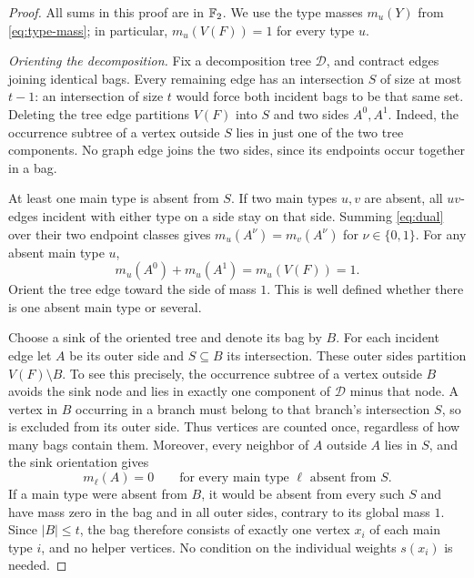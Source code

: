 \begin{proof}
All sums in this proof are in \(\mathbb F_2\).
We use the type masses \(m_u(Y)\) from \eqref{eq:type-mass};
in particular, \(m_u(V(F))=1\) for every type \(u\).

\smallskip
\noindent\emph{Orienting the decomposition.}
Fix a decomposition tree \(\mathcal D\), and contract edges joining
identical bags.  Every remaining edge has an intersection \(S\) of
size at most \(t-1\): an intersection of size \(t\) would force both
incident bags to be that same set.
Deleting the tree edge partitions \(V(F)\) into \(S\) and two sides
\(A^0,A^1\).  Indeed, the occurrence subtree of a vertex outside \(S\)
lies in just one of the two tree components.  No graph edge joins the
two sides, since its endpoints occur together in a bag.

At least one main type is absent from \(S\).
If two main types \(u,v\) are absent, all \(uv\)-edges incident with
either type on a side stay on that side.  Summing \eqref{eq:dual}
over their two endpoint classes gives
\(m_u(A^\nu)=m_v(A^\nu)\) for \(\nu\in\{0,1\}\).
For any absent main type \(u\),
\[
m_u(A^0)+m_u(A^1)=m_u(V(F))=1.
\]
Orient the tree edge toward the side of mass \(1\).
This is well defined whether there is one absent main type or several.

Choose a sink of the oriented tree and denote its bag by \(B\).
For each incident edge let \(A\) be its outer side and \(S\subseteq B\)
its intersection.  These outer sides partition \(V(F)\setminus B\).
To see this precisely, the occurrence subtree of a vertex outside
\(B\) avoids the sink node and lies in exactly one component of
\(\mathcal D\) minus that node.  A vertex in \(B\) occurring in a branch
must belong to that branch's intersection \(S\), so is excluded from
its outer side.  Thus vertices are counted once, regardless of how
many bags contain them.  Moreover, every neighbor of \(A\) outside
\(A\) lies in \(S\), and the sink orientation gives
\[
m_\ell(A)=0
\qquad\text{for every main type \(\ell\) absent from \(S\).}
\]
If a main type were absent from \(B\), it would be absent from every
such \(S\) and have mass zero in the bag and in all outer sides,
contrary to its global mass \(1\).
Since \(|B|\le t\), the bag therefore consists of exactly one vertex
\(x_i\) of each main type \(i\), and no helper vertices.
No condition on the individual weights \(s(x_i)\) is needed.


\end{proof}
